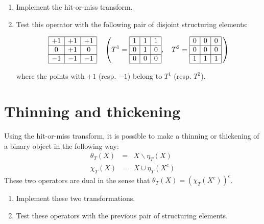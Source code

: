 \begin{qbox}
\begin{enumerate}
	\item Implement the hit-or-miss transform.
	\item Test this operator with the following pair of disjoint structuring elements:
	
	\[\begin{array}{|c|c|c|}
	\hline
	+1&+1&+1\\\hline
	0&+1&0\\\hline
	-1&-1&-1\\\hline
	\end{array}
	\quad
	\left(T^1=\begin{array}{|c|c|c|}
	\hline
	1&1&1\\\hline
	0&1&0\\\hline
	0&0&0\\\hline
	\end{array},\quad
	T^2=\begin{array}{|c|c|c|}
	\hline
	0&0&0\\\hline
	0&0&0\\\hline
	1&1&1\\\hline
	\end{array}\,\right)
	\]
	
	where the points with $+1$ (resp. $-1$) belong to $T^1$ (resp. $T^2$). 
\end{enumerate}
\end{qbox}

\section{Thinning and thickening}
Using the hit-or-miss transform, it is possible to make a thinning or thickening of a binary object in the following way:
\begin{eqnarray}
\theta_T(X)&=&X\backslash \eta_T(X)\\
\chi_T(X)&=&X\cup \eta_T(X^c)
\end{eqnarray}
These two operators are dual in the sense that $\theta_T(X)=(\chi_T(X^c))^c$.
\begin{qbox}
\begin{enumerate}
	\item Implement these two transformations.
	\item Test these operators with the previous pair of structuring elements.
\end{enumerate}
\end{qbox}

